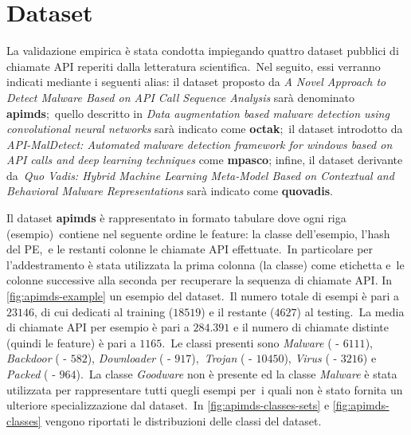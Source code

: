 \newcommand{\datasetapimds}{\textit{A Novel Approach to Detect Malware Based on API Call Sequence Analysis}}
\newcommand{\datasetoctak}{\textit{Data augmentation based malware detection using convolutional neural networks}}
\newcommand{\datasetmpasco}{\textit{API-MalDetect: Automated malware detection framework for windows based on API calls and deep learning techniques}}
\newcommand{\datasetquovaids}{\textit{Quo Vadis: Hybrid Machine Learning Meta-Model Based on Contextual and Behavioral Malware Representations}}
\newcommand{\clsper}[3]{\textit{#1} (\percc{#2} - $#3$)}
\section{Dataset}

La validazione empirica è stata condotta impiegando quattro dataset pubblici di chiamate API reperiti dalla letteratura scientifica.\
Nel seguito, essi verranno indicati mediante i seguenti alias: il dataset proposto da \datasetapimds{} sarà denominato \textbf{apimds};\
quello descritto in \datasetoctak{} sarà indicato come \textbf{octak};\
il dataset introdotto da \datasetmpasco{} come \textbf{mpasco}; infine, il dataset derivante da\
\datasetquovaids{} sarà indicato come \textbf{quovadis}.

Il dataset \textbf{apimds} è rappresentato in formato tabulare dove ogni riga (esempio)\
contiene nel seguente ordine le feature: la classe dell'esempio, l'hash del PE,\
e le restanti colonne le chiamate API effettuate.\
In particolare per l'addestramento è stata utilizzata la prima colonna (la classe) come etichetta e\
le colonne successive alla seconda per recuperare la sequenza di chiamate API.
In \autoref{fig:apimds-example} un esempio del dataset.\
Il numero totale di esempi è pari a $23146$, di cui  dedicati al training ($18519$) e il restante ($4627$) al testing.\
La media di chiamate API per esempio è pari a $284.391$ e il numero di chiamate distinte (quindi le feature) è pari a $1165$.\
Le classi presenti sono \clsper{Malware}{27.4}{6111}, \clsper{Backdoor}{2.6}{582}, \clsper{Downloader}{4,1}{917},\
\clsper{Trojan}{46.9}{10450}, \clsper{Virus}{14.6}{3216} e \clsper{Packed}{4.3}{964}.\
La classe \textit{Goodware} non è presente ed la classe \textit{Malware} è stata utilizzata per rappresentare tutti quegli esempi per\
i quali non è stato fornita un ulteriore specializzazione dal dataset.\
In \autoref{fig:apimds-classes-sets} e \autoref{fig:apimds-classes} vengono riportati le distribuzioni delle classi del dataset.\

